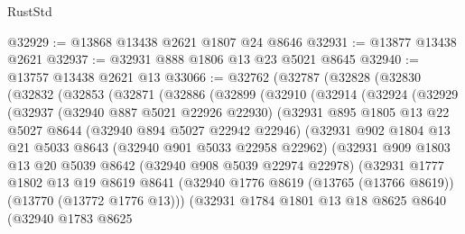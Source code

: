 \begin{lexlean}{RustStd}
\begin{coremodule}
@32929 := @13868 @13438 @2621 @1807 @24 @8646
@32931 := @13877 @13438 @2621
@32937 := @32931 @888 @1806 @13 @23 @5021 @8645
@32940 := @13757 @13438 @2621 @13
@33066 := @32762
    (@32787
      (@32828
        (@32830
          (@32832
            (@32853
              (@32871
                (@32886
                  (@32899
                    (@32910
                      (@32914
                        (@32924
                          (@32929
                            (@32937
                              (@32940 @887 @5021 @22926 @22930)
                              (@32931
                                @895
                                @1805
                                @13
                                @22
                                @5027
                                @8644
                                (@32940 @894 @5027 @22942 @22946)
                                (@32931
                                  @902
                                  @1804
                                  @13
                                  @21
                                  @5033
                                  @8643
                                  (@32940 @901 @5033 @22958 @22962)
                                  (@32931
                                    @909
                                    @1803
                                    @13
                                    @20
                                    @5039
                                    @8642
                                    (@32940 @908 @5039 @22974 @22978)
                                    (@32931
                                      @1777
                                      @1802
                                      @13
                                      @19
                                      @8619
                                      @8641
                                      (@32940
                                        @1776
                                        @8619
                                        (@13765 (@13766 @8619))
                                        (@13770 (@13772 @1776 @13)))
                                      (@32931
                                        @1784
                                        @1801
                                        @13
                                        @18
                                        @8625
                                        @8640
                                        (@32940
                                          @1783
                                          @8625

\end{coremodule}
\end{lexlean}
